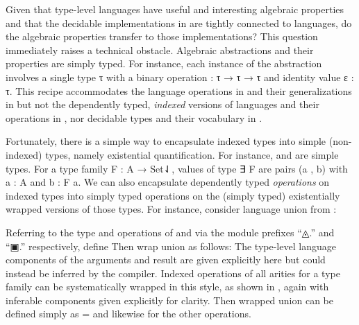 \documentclass[acmsmall,screen,anonymous,timestamp]{acmart}
\begin{document}

\rnc{}

Given that type-level languages have useful and interesting algebraic properties and that the decidable implementations in  are tightly connected to languages, do the algebraic properties transfer to those implementations?
This question immediately raises a technical obstacle.
Algebraic abstractions and their properties are simply typed.
For instance, each instance of the  abstraction involves a single type \AB τ with a binary operation { \AK : \AB τ \AK → \AB τ \AK → \AB τ} and identity value {\AB ε \AK : \AB τ}.
This recipe accommodates the language operations in  and their generalizations in  but not the dependently typed, \emph{indexed} versions of languages and their operations in , nor decidable types and their vocabulary in .

Fortunately, there is a simple way to encapsulate indexed types into simple (non-indexed) types, namely existential quantification.
For instance, { } and { } are simple types.
For a type family {\AB F \AK : \AB A \AK → \APT Set⇃}, values of type {\AF ∃ \AB F} are pairs {(\AB a , \AB b)} with {\AB a \AK : \AB A} and {\AB b \AK : \AB F \AB a}.
We can also encapsulate dependently typed \emph{operations} on indexed types into simply typed operations on the (simply typed) existentially wrapped versions of those types.
For instance, consider language union from :
\begin{code}
\>[2]%
\>[7]\AgdaSymbol{:}\AgdaSpace{}%
%
\>[15]%
\>[18]\AgdaSpace{}%
\AgdaSpace{}%
%
\>[28]\AgdaSpace{}%
\AgdaSpace{}%
\AgdaSymbol{(}%
\>[39]%
\>[44]\AgdaSymbol{)}\<%
\end{code}
Referring to the type and operations of  and  via the module prefixes ``{◬.}\hspace{0.05em}'' and ``{▣.}\hspace{0.05em}'' respectively, define 
Then wrap union as follows:
The type-level language components of the arguments and result are given explicitly here but could instead be inferred by the compiler.
\rnc{}
Indexed operations of all arities for a type family  can be systematically wrapped in this style, as shown in
, again with inferable components given explicitly for clarity.
Then wrapped union can be defined simply as { \AS =  } and likewise for the other operations.
\end{document}
